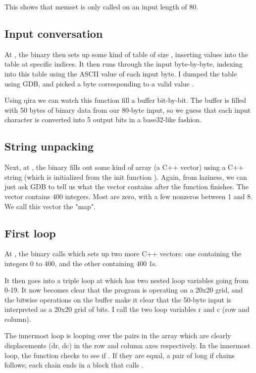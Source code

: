 \documentclass[a4paper,UTF8]{ctexart}
\begin{document}
      This shows that memset is only called on an input length of 80.
      
\subsection{Input conversation}
     At , the binary then sets up some kind of table of size , inserting  values into the table at
specific indices. It then runs through the input byte-by-byte, indexing into this table using the ASCII value of
each input byte. I dumped the table using GDB, and picked a byte corresponding to a valid value .

     Using qira we can watch this function fill a buffer bit-by-bit. The buffer is filled with 50 bytes of binary data from our 80-byte input, so we guess that each input character is converted into 5 output bits in a base32-like fashion.

\subsection{String unpacking}

    Next, at , the binary fills out some kind of array (a C++ vector) using a C++ string (which is
initialized from the init function ). Again, from laziness, we can just ask GDB to tell us what the
vector contains after the function finishes. The vector contains 400 integers. Most are zero, with a few nonzeros
between 1 and 8. We call this vector the "map".

  \subsection{First loop}

At , the binary calls  which sets up two more C++ vectors: one containing the integers 0 to 400,
and the other containing 400 1s.

It then goes into a triple loop at  which has two nested loop variables going from 0-19. It now becomes
clear that the program is operating on a 20x20 grid, and the bitwise operations on the buffer make it clear that
the 50-byte input is interpreted as a 20x20 grid of bits. I call the two loop variables r and c (row and column).

The innermost loop is looping over the pairs in the array  which are clearly displacements (dr, dc)
in the row and column axes respectively. In the innermost loop, the function checks to see if . If they are equal, a pair of long if chains follows; each chain ends in a block that calls .
\end{document}
